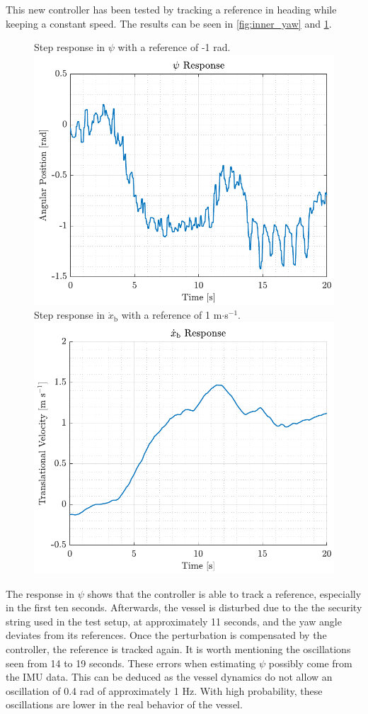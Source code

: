 This new controller has been tested by tracking a reference in heading while keeping a constant speed. The results can be seen in \autoref{fig:inner_yaw} and \ref{fig:inner_xbdot}.
%
\begin{figure}[H]
    \captionbox 
    {   
        Step response in $\psi$ with a reference of -1 rad.
        \label{fig:inner_yaw}
    }                                                                 
    {                                                                  
        \includegraphics[width=.45\textwidth]{figures/inner_yaw}         
    }                                                                    
    \hspace{5pt}                                                          
    \captionbox  
    {      
        Step response in $\dot{x}_\mathrm{b}$ with a reference of 1 m$\cdot$s$^{-1}$.
        \label{fig:inner_xbdot}
    }                                                                          
    {
        \includegraphics[width=.45\textwidth]{figures/inner_xbdot}
    }
\end{figure}

The response in $\psi$ shows that the controller is able to track a reference, especially in the first ten seconds. Afterwards, the vessel is disturbed due to the the security string used in the test setup, at approximately 11 seconds, and the yaw angle deviates from its references. Once the perturbation is compensated by the controller, the reference is tracked again. It is worth mentioning the oscillations seen from 14 to 19 seconds. These errors when estimating $\psi$ possibly come from the IMU data. This can be deduced as the vessel dynamics do not allow an oscillation of 0.4 rad of approximately 1 Hz. With high probability, these oscillations are lower in the real behavior of the vessel.

